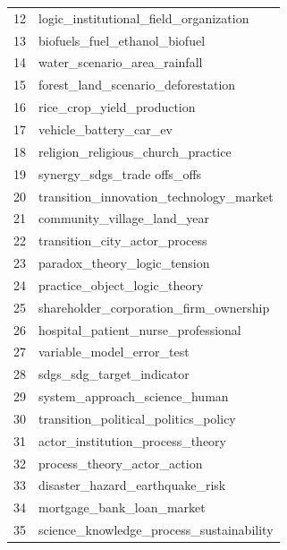 \documentclass[12pt]{article}
\begin{document}
\begin{landscape}
\begin{figure}[htbp]
\begin{minipage}{0.25\textwidth}
\begin{tabular}{rl}
           12 &             logic\_institutional\_field\_organization \\
           13 &                      biofuels\_fuel\_ethanol\_biofuel \\
           14 &                       water\_scenario\_area\_rainfall \\
           15 &                 forest\_land\_scenario\_deforestation \\
           16 &                         rice\_crop\_yield\_production \\
           17 &                             vehicle\_battery\_car\_ev \\
           18 &                 religion\_religious\_church\_practice \\
           19 &                       synergy\_sdgs\_trade offs\_offs \\
           20 &            transition\_innovation\_technology\_market \\
           21 &                        community\_village\_land\_year \\
           22 &                      transition\_city\_actor\_process \\
           23 &                       paradox\_theory\_logic\_tension \\
           24 &                       practice\_object\_logic\_theory \\
           25 &             shareholder\_corporation\_firm\_ownership \\
           26 &                hospital\_patient\_nurse\_professional \\
           27 &                          variable\_model\_error\_test \\
           28 &                          sdgs\_sdg\_target\_indicator \\
           29 &                      system\_approach\_science\_human \\
           30 &               transition\_political\_politics\_policy \\
           31 &                   actor\_institution\_process\_theory \\
           32 &                        process\_theory\_actor\_action \\
           33 &                    disaster\_hazard\_earthquake\_risk \\
           34 &                          mortgage\_bank\_loan\_market \\
           35 &           science\_knowledge\_process\_sustainability \\

\end{tabular}
\end{minipage}
\end{figure}
\end{landscape}
\end{document}
